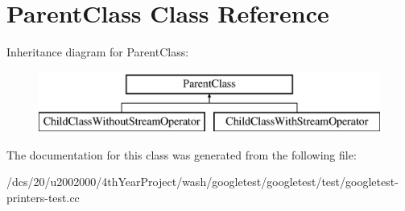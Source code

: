 \hypertarget{classParentClass}{}\section{Parent\+Class Class Reference}
\label{classParentClass}
Inheritance diagram for Parent\+Class\+:\begin{figure}[H]
\begin{center}
\leavevmode
\includegraphics[height=2.000000cm]{classParentClass}
\end{center}
\end{figure}


The documentation for this class was generated from the following file\+:\begin{DoxyCompactItemize}
\item 
/dcs/20/u2002000/4th\+Year\+Project/wash/googletest/googletest/test/googletest-\/printers-\/test.\+cc\end{DoxyCompactItemize}

